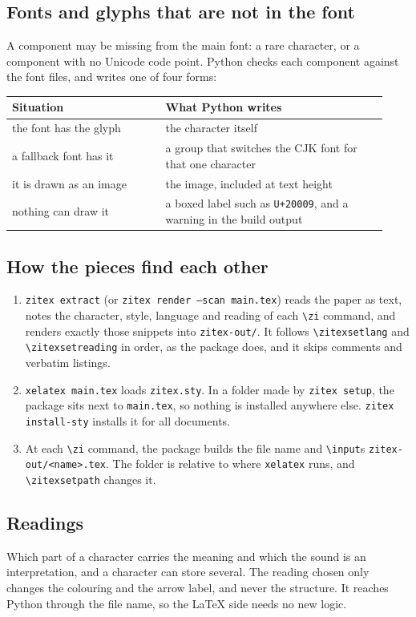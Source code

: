 \documentclass[11pt]{article}
\newcommand{\cmd}[1]{\texttt{\textbackslash #1}}               %
\begin{document}
\subsection{Fonts and glyphs that are not in the font}
A component may be missing from the main font: a rare character, or a component with no Unicode code point. Python checks each component against the font files, and writes one of four forms:

\begin{center}
\small
\begin{tabular}{@{}p{0.38\linewidth}p{0.55\linewidth}@{}}
\toprule
Situation & What Python writes \\
\midrule
the font has the glyph      & the character itself \\
a fallback font has it      & a group that switches the CJK font for that one character \\
it is drawn as an image     & the image, included at text height \\
nothing can draw it         & a boxed label such as \texttt{U+20009}, and a warning in the build output \\
\bottomrule
\end{tabular}
\end{center}

\subsection{How the pieces find each other}
\begin{enumerate}
  \item \texttt{zitex extract} (or \texttt{zitex render --scan main.tex}) reads the paper as text, notes the character, style, language and reading of each \cmd{zi} command, and renders exactly those snippets into \texttt{zitex-out/}. It follows \cmd{zitexsetlang} and \cmd{zitexsetreading} in order, as the package does, and it skips comments and verbatim listings.
  \item \texttt{xelatex main.tex} loads \texttt{zitex.sty}. In a folder made by \texttt{zitex setup}, the package sits next to \texttt{main.tex}, so nothing is installed anywhere else. \texttt{zitex install-sty} installs it for all documents.
  \item At each \cmd{zi} command, the package builds the file name and \cmd{input}s \texttt{zitex-out/<name>.tex}. The folder is relative to where \texttt{xelatex} runs, and \cmd{zitexsetpath} changes it.
\end{enumerate}

\subsection{Readings}
Which part of a character carries the meaning and which the sound is an interpretation, and a character can store several. The reading chosen only changes the colouring and the arrow label, and never the structure. It reaches Python through the file name, so the \LaTeX{} side needs no new logic.
\end{document}
